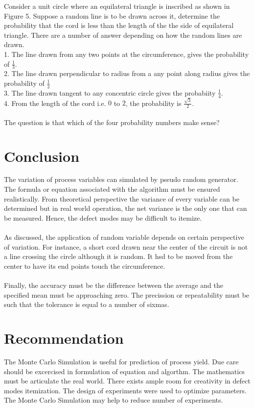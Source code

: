 \documentclass[10pt,journal,compsoc]{IEEEtran} \ifCLASSOPTIONcompsoc
\begin{document}
\noindent Consider a unit circle where an equilateral triangle is inscribed as    shown in Figure 5. Suppose a random line is to be drawn across it,    determine the probability that the cord is less than the length of the    the side of equilateral triangle. There are a number of answer depending    on how the random lines are drawn. \\    1. The line drawn from any two points at the circumference, gives the    probability of $\frac{1}{3}$. \\    2. The line drawn perpendicular to radius from a any point along radius gives the    probability of $\frac{1}{2}$ \\    3. The line drawn tangent to any concentric circle gives the probabiity    $\frac{1}{4}$. \\    4. From the length of the cord i.e. $0$ to $2$, the probability is    $\frac{\sqrt{3}}{2}$. \\ \\    The question is that which of the four probability numbers make sense? 
\noindent \section{Conclusion}The variation of process variables can simulated by pseudo random generator.     The formula or equation associated with the algorithm must be ensured     realistically. From theoretical perspective the variance of every variable     can be determined but in real world operation, the net variance is the     only one that can be measured. Hence, the defect modes may be difficult     to itemize. \\ \\     As discussed, the application of random variable depends on certain     perspective of variation. For instance, a short cord drawn near the center     of the circuit is not a line crossing the circle although it is random.     It hsd to be moved from the center to have its end points touch the     circumference. \\ \\     Finally, the accuracy must be the difference between the average and the     specified mean must be approaching zero. The precission or repeatability     must be such that the tolerance is equal to a number of sixmas. 
\noindent \section{Recommendation}The Monte Carlo Simulation is useful for prediction of process yield.     Due care should be excercised in formulation of equation and algorthm.     The mathematics must be articulate the real world. There exists ample     room for creativity in defect modes itemization. The design of experiments     were used to optimize parameters. The Monte Carlo Simulation may help     to reduce number of experiments.
\end{document}
